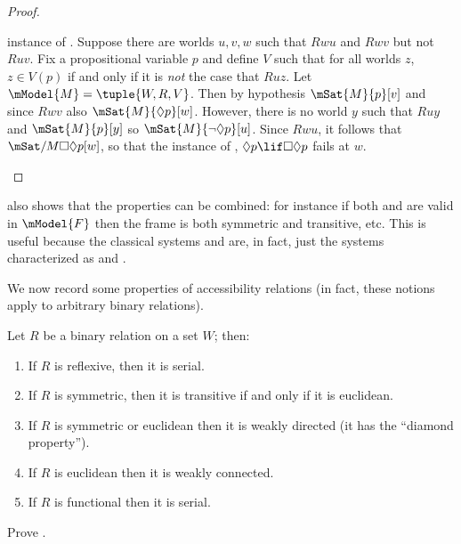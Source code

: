 \documentclass[../../../include/open-logic-section]{subfiles}
\begin{document}
\begin{proof}
\begin{enumerate}
    instance of . Suppose there are worlds $u, v, w$ such that
    $Rwu$ and $Rwv$ but not $Ruv$. Fix a propositional variable $p$
    and define $V$ such that for all worlds $z$, $z \in V(p)$ if and
    only if it is \emph{not} the case that $Ruz$. Let $\mModel{M}
    =\tuple{W, R, V}$. Then by hypothesis $\mSat{M}{p}[v]$ and since
    $Rwv$ also $\mSat{M}{\Diamond p}[w]$. However, there is no world
    $y$ such that $Ruy$ and $\mSat{M}{p}[y]$ so $\mSat{M}{\lnot
      \Diamond p}[u]$. Since $Rwu$, it follows that
    $\mSat/{M}{\Box\Diamond p}[w]$, so that the instance of ,
    $\Diamond p \lif \Box\Diamond p$ fails at $w$.
  \end{enumerate}
\end{proof}

 also shows that the properties can be
combined: for instance if both  and  are valid in
$\mModel{F}$ then the frame is both symmetric and transitive,
etc. This is useful because the classical systems  and
 are, in fact, just the systems characterized as  and
.
  
We now record some properties of accessibility relations (in fact,
these notions apply to arbitrary binary relations).

\begin{prop}
  Let $R$ be a binary relation on a set $W$; then:
  \begin{enumerate}
  \item If $R$ is reflexive, then it is serial.
  \item If $R$ is symmetric, then it is transitive if and only if it
    is euclidean.
  \item If $R$ is symmetric or euclidean then it is weakly directed
    (it has the ``diamond property'').
  \item If $R$ is euclidean then it is weakly connected.
  \item If $R$ is functional then it is serial.  
  \end{enumerate}
\end{prop}

\begin{prob}
  Prove .
\end{prob}
\end{document}
